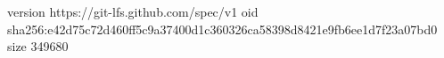 version https://git-lfs.github.com/spec/v1
oid sha256:e42d75c72d460ff5c9a37400d1c360326ca58398d8421e9fb6ee1d7f23a07bd0
size 349680
